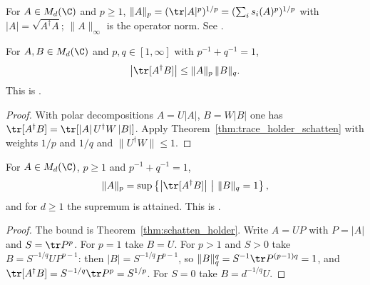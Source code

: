 \begin{definition}
    \label{def:schatten_norm}
    \leanok
    For $A\in M_d(\C)$ and $p\ge1$, $\|A\|_p=(\tr|A|^p)^{1/p}=(\sum_is_i(A)^p)^{1/p}$
    with $|A|=\sqrt{A^\dagger A}$; $\|A\|_\infty$ is the operator norm.
    See \cite[Section~8.1]{Wolf2012Quantum}.
\end{definition}

\begin{theorem}
    \label{thm:schatten_holder}
    \leanok
    For $A,B\in M_d(\C)$ and $p,q\in[1,\infty]$ with $p^{-1}+q^{-1}=1$,
    \begin{align*}
        \bigl|\tr[A^\dagger B]\bigr|\le\|A\|_p\,\|B\|_q.
    \end{align*}
    This is \cite[Eq.~(8.6)]{Wolf2012Quantum}.
\end{theorem}
\begin{proof}\leanok
    With polar decompositions $A=U|A|$, $B=W|B|$ one has
    $\tr[A^\dagger B]=\tr[|A|\,U^\dagger W\,|B|]$. Apply
    Theorem~\ref{thm:trace_holder_schatten} with weights $1/p$ and $1/q$ and
    $\|U^\dagger W\|\le1$.
\end{proof}

\begin{theorem}
    \label{thm:schatten_variational}
    \leanok
    For $A\in M_d(\C)$, $p\ge1$ and $p^{-1}+q^{-1}=1$,
    \begin{align*}
        \|A\|_p=\sup\left\{\bigl|\tr[A^\dagger B]\bigr|\ \middle|\ \|B\|_q=1\right\},
    \end{align*}
    and for $d\ge1$ the supremum is attained. This is
    \cite[Eq.~(8.10)]{Wolf2012Quantum}.
\end{theorem}
\begin{proof}\leanok
    The bound is Theorem~\ref{thm:schatten_holder}. Write $A=UP$ with
    $P=|A|$ and $S=\tr P^p$. For $p=1$ take $B=U$. For $p>1$ and $S>0$ take
    $B=S^{-1/q}UP^{p-1}$: then $|B|=S^{-1/q}P^{p-1}$, so $\|B\|_q^q=S^{-1}\tr
    P^{(p-1)q}=1$, and $\tr[A^\dagger B]=S^{-1/q}\tr P^p=S^{1/p}$. For $S=0$
    take $B=d^{-1/q}U$.
\end{proof}

